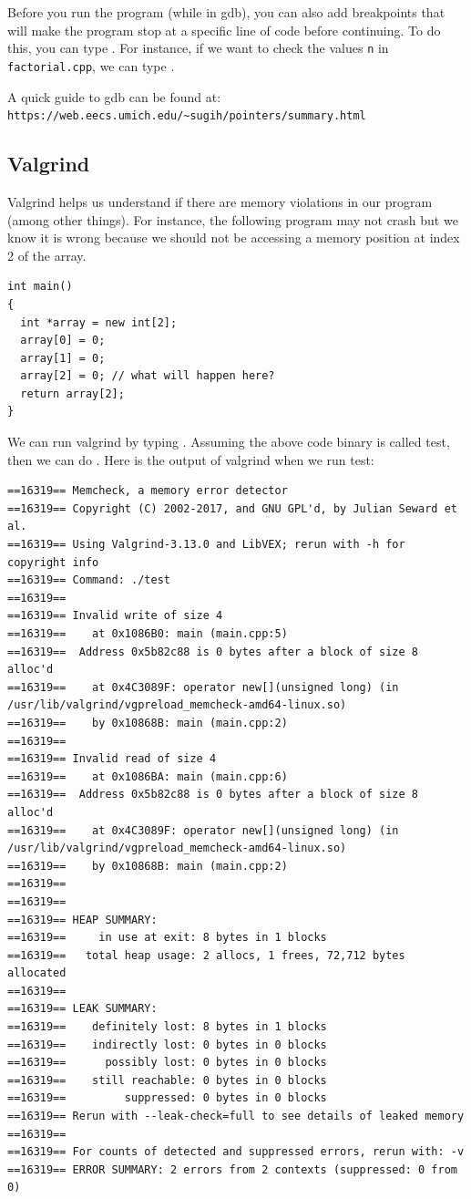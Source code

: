 \documentclass[12pt]{article}
\begin{document}
Before you run the program (while in gdb), you can also add breakpoints that will make the
program stop at a specific line of code before continuing.  To do this, you can
type . For instance, if we
want to check the values \texttt{n} in \texttt{factorial.cpp}, we can type
.

A quick guide to gdb can be found at:\\
\texttt{https://web.eecs.umich.edu/\textasciitilde{}sugih/pointers/summary.html}

\subsection*{Valgrind}

Valgrind helps us understand if there are memory violations in our program
(among other things). For instance, the following program may not crash but we
know it is wrong because we should not be accessing a memory position at index 2
of the array.

\begin{lstlisting}
int main()
{
  int *array = new int[2];
  array[0] = 0;
  array[1] = 0;
  array[2] = 0; // what will happen here?
  return array[2];
}
\end{lstlisting}

We can run valgrind by typing . Assuming the
above code binary is called test, then we can do . Here is the
output of valgrind when we run test:

\begin{verbatim}
==16319== Memcheck, a memory error detector
==16319== Copyright (C) 2002-2017, and GNU GPL'd, by Julian Seward et al.
==16319== Using Valgrind-3.13.0 and LibVEX; rerun with -h for copyright info
==16319== Command: ./test
==16319== 
==16319== Invalid write of size 4
==16319==    at 0x1086B0: main (main.cpp:5)
==16319==  Address 0x5b82c88 is 0 bytes after a block of size 8 alloc'd
==16319==    at 0x4C3089F: operator new[](unsigned long) (in
/usr/lib/valgrind/vgpreload_memcheck-amd64-linux.so)
==16319==    by 0x10868B: main (main.cpp:2)
==16319== 
==16319== Invalid read of size 4
==16319==    at 0x1086BA: main (main.cpp:6)
==16319==  Address 0x5b82c88 is 0 bytes after a block of size 8 alloc'd
==16319==    at 0x4C3089F: operator new[](unsigned long) (in
/usr/lib/valgrind/vgpreload_memcheck-amd64-linux.so)
==16319==    by 0x10868B: main (main.cpp:2)
==16319== 
==16319== 
==16319== HEAP SUMMARY:
==16319==     in use at exit: 8 bytes in 1 blocks
==16319==   total heap usage: 2 allocs, 1 frees, 72,712 bytes allocated
==16319== 
==16319== LEAK SUMMARY:
==16319==    definitely lost: 8 bytes in 1 blocks
==16319==    indirectly lost: 0 bytes in 0 blocks
==16319==      possibly lost: 0 bytes in 0 blocks
==16319==    still reachable: 0 bytes in 0 blocks
==16319==         suppressed: 0 bytes in 0 blocks
==16319== Rerun with --leak-check=full to see details of leaked memory
==16319== 
==16319== For counts of detected and suppressed errors, rerun with: -v
==16319== ERROR SUMMARY: 2 errors from 2 contexts (suppressed: 0 from 0)
\end{verbatim}
\end{document}
